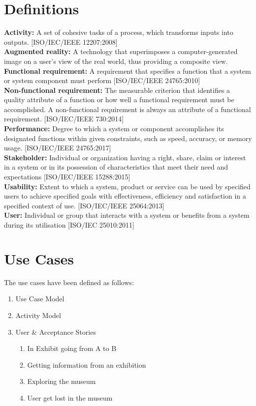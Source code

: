 \section{Definitions}
\textbf{Activity:} A set of cohesive tasks of a process, which transforms inputs into outputs. [ISO/IEC/IEEE 12207:2008]\\
\newline
\textbf{Augmented reality:} A technology that superimposes a computer-generated image on a user's view of the real world, thus providing a composite view. \\
\newline
\textbf{Functional requirement:} A requirement that specifies a function that a system or system component must perform [ISO/IEC/IEEE 24765:2010]\\
\newline
\textbf{Non-functional requirement:} The measurable criterion that identifies a quality attribute of a function or how well a functional requirement must be accomplished. A non-functional requirement is always an attribute of a functional requirement. [ISO/IEC/IEEE 730:2014]\\
\newline
\textbf{Performance:} Degree to which a system or component accomplishes its designated functions within given constraints, such as speed, accuracy, or memory usage. [ISO/IEC/IEEE 24765:2017]\\
\newline
\textbf{Stakeholder:} Individual or organization having a right, share, claim or interest in a system or in its possession of characteristics that meet their need and expectations [ISO/IEC/IEEE 15288:2015]\\
\newline
\textbf{Usability:} Extent to which a system, product or service can be used by specified users to achieve specified goals with effectiveness, efficiency and satisfaction in a specified context of use. [ISO/IEC/IEEE 25064:2013]\\
\newline
\textbf{User:} Individual or group that interacts with a system or benefits from a system during its utilisation [ISO/IEC 25010:2011]

\section{Use Cases}
The use cases have been defined as follows:
\begin{enumerate}
    \item Use Case Model
    \item Activity Model
    \item User \& Acceptance Stories
    \begin{enumerate}
        \item In Exhibit going from A to B
        \item Getting information from an exhibition
        \item Exploring the museum
        \item User get lost in the museum
    \end{enumerate}
\end{enumerate}

